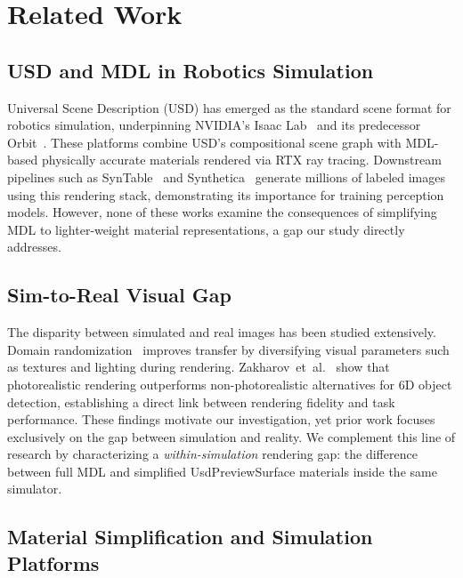 \section{Related Work}
\label{sec:related_work}

\subsection{USD and MDL in Robotics Simulation}

Universal Scene Description (USD) has emerged as the standard scene format for
robotics simulation, underpinning NVIDIA's Isaac
Lab~\cite{Mittal2025Isaac} and its predecessor
Orbit~\cite{Mittal2023Orbit}. These platforms combine USD's compositional scene
graph with MDL-based physically accurate materials rendered via RTX ray tracing.
Downstream pipelines such as SynTable~\cite{Ng2023SynTable} and
Synthetica~\cite{Singh2025Synthetica} generate millions of labeled images using
this rendering stack, demonstrating its importance for training perception
models. However, none of these works examine the consequences of simplifying
MDL to lighter-weight material representations, a gap our study directly
addresses.

\subsection{Sim-to-Real Visual Gap}

The disparity between simulated and real images has been studied extensively.
Domain randomization~\cite{Tobin2017Domain,Tremblay2018Training} improves
transfer by diversifying visual parameters such as textures and lighting during
rendering. Zakharov~et~al.~\cite{Zakharov2022Photo} show that photorealistic
rendering outperforms non-photorealistic alternatives for 6D object detection,
establishing a direct link between rendering fidelity and task performance.
These findings motivate our investigation, yet prior work focuses exclusively
on the gap between simulation and reality. We complement this line of research
by characterizing a \emph{within-simulation} rendering gap: the difference
between full MDL and simplified UsdPreviewSurface materials inside the same
simulator.

\subsection{Material Simplification and Simulation Platforms}

